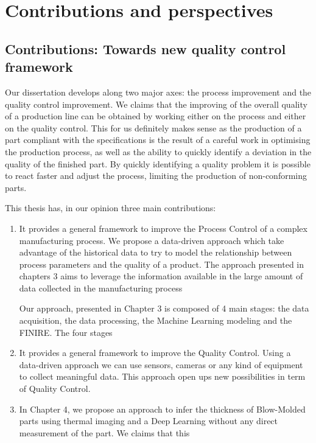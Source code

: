 \chapter{Contributions and perspectives} \label{Contributions and perspectives}
\minitoc



\section{Contributions: Towards new quality control framework}

Our dissertation develops along two major axes: the process improvement and the quality control improvement. We claims that the improving of the overall quality of a production line can be obtained by working either on the process and either on the quality control. This for us definitely makes sense as the production of a part compliant with the specifications is the result of a careful work in optimising the production process, as well as the ability to quickly identify a deviation in the quality of the finished part. By quickly identifying a quality problem it is possible to react faster and adjust the process, limiting the production of non-conforming parts.

This thesis has, in our opinion three main contributions:

\begin{enumerate}
    \item It provides a general framework to improve the Process Control of a complex manufacturing process. We propose a data-driven approach which take advantage of the historical data to try to model the relationship between process parameters and the quality of a product. The approach presented in chapters 3 aims to leverage the information available in the large amount of data collected in the manufacturing process 
    
    Our approach, presented in Chapter 3 is composed of 4 main stages: the data acquisition, the data processing, the Machine Learning modeling and the FINIRE. The four stages 
    \item It provides a general framework to improve the Quality Control. Using a data-driven approach we can use sensors, cameras or any kind of equipment to collect meaningful data. This approach open ups new possibilities in term of Quality Control.  
    \item In Chapter 4, we propose an approach to infer the thickness of Blow-Molded parts using thermal imaging and a Deep Learning without any direct measurement of the part. We claims that this    
\end{enumerate}


